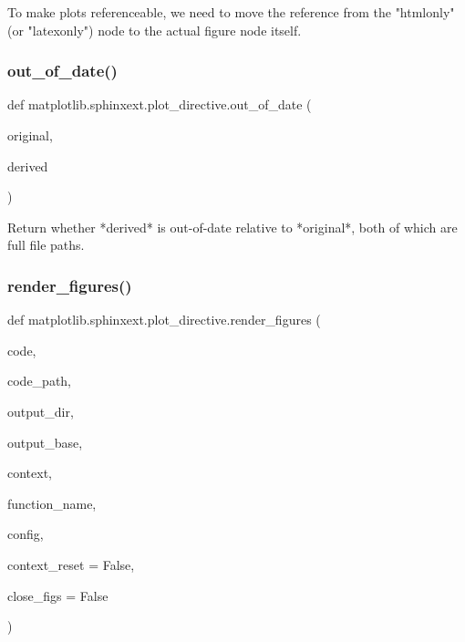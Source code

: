 \begin{DoxyVerb}To make plots referenceable, we need to move the reference from the
"htmlonly" (or "latexonly") node to the actual figure node itself.
\end{DoxyVerb}
 \mbox{\label{namespacematplotlib_1_1sphinxext_1_1plot__directive_a870ed026933a3213ab3db642bd92b3a5}} 
\subsubsection{\texorpdfstring{out\+\_\+of\+\_\+date()}{out\_of\_date()}}
{\footnotesize\ttfamily def matplotlib.\+sphinxext.\+plot\+\_\+directive.\+out\+\_\+of\+\_\+date (\begin{DoxyParamCaption}\item[{}]{original,  }\item[{}]{derived }\end{DoxyParamCaption})}

\begin{DoxyVerb}Return whether *derived* is out-of-date relative to *original*, both of
which are full file paths.
\end{DoxyVerb}
 \mbox{\label{namespacematplotlib_1_1sphinxext_1_1plot__directive_a349e94d00174448022b43700575b10c8}} 
\subsubsection{\texorpdfstring{render\+\_\+figures()}{render\_figures()}}
{\footnotesize\ttfamily def matplotlib.\+sphinxext.\+plot\+\_\+directive.\+render\+\_\+figures (\begin{DoxyParamCaption}\item[{}]{code,  }\item[{}]{code\+\_\+path,  }\item[{}]{output\+\_\+dir,  }\item[{}]{output\+\_\+base,  }\item[{}]{context,  }\item[{}]{function\+\_\+name,  }\item[{}]{config,  }\item[{}]{context\+\_\+reset = {\ttfamily False},  }\item[{}]{close\+\_\+figs = {\ttfamily False} }\end{DoxyParamCaption})}

